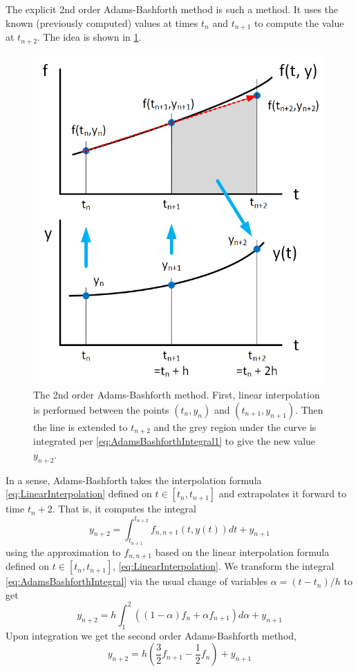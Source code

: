 \documentclass[hidelinks,notitlepage]{book}
\begin{document}
The explicit 2nd order Adams-Bashforth method is such a method.  It uses the known (previously computed) values at times $t_n$ and $t_{n+1}$ to compute the value at $t_{n+2}$.  The idea is shown in \cref{fig:AdamsBashforth2}.  
\begin{figure}[tbh]
	\centering
	\includegraphics[width=0.6\columnwidth]{AdamsBashforth2.png}
	\caption{The 2nd order Adams-Bashforth method.  First, linear interpolation is performed between the points $(t_n, y_n)$ and $(t_{n+1}, y_{n+1})$.  Then the line is extended to $t_{n+2}$ and the grey region under the curve is integrated per \cref{eq:AdamsBashforthIntegral1} to give the new value $y_{n+2}$.}
	\label{fig:AdamsBashforth2}
\end{figure}
In a sense, Adams-Bashforth takes the interpolation formula \cref{eq:LinearInterpolation} defined on $t \in [t_n, t_{n+1}]$ and extrapolates it forward to time $t_n+2$.  That is, it computes the integral 
\begin{equation}
\label{eq:AdamsBashforthIntegral}
y_{n+2} = \int_{t_{n+1}}^{t_{n+2}} f_{n, n+1}(t, y(t)) dt + y_{n+1}
\end{equation}
using the approximation to $f_{n, n+1}$ based on the linear interpolation formula defined on $t \in [t_n, t_{n+1}]$, \cref{eq:LinearInterpolation}.  We transform the integral \cref{eq:AdamsBashforthIntegral} via the usual change of variables $\alpha = (t - t_n)/h$ to get
\begin{equation}
\label{eq:AdamsBashforthIntegral1}
y_{n+2} = h \int_{1}^{2}  \left( (1-\alpha) f_n + \alpha f_{n+1} \right) d \alpha  + y_{n+1}
\end{equation}
Upon integration we get the second order Adams-Bashforth method,
\begin{equation}
\label{eq:AdamsBashforthSecondOrder}
y_{n+2} = h \left( \frac{3}{2} f_{n+1} - \frac{1}{2} f_{n} \right)   + y_{n+1}
\end{equation}
\end{document}
